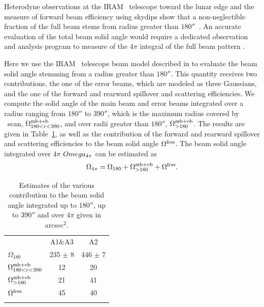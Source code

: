 Heterodyne observations at the IRAM \trentemetre\ telescope
toward the lunar edge and the measure of forward beam efficiency using
skydips show that a non-neglectible fraction of the full beam stems
from radius greater than $180''$~\citep{Greve2008, Kramer2013}.
An accurate evaluation of the total beam solid angle would require a
dedicated observation {\lp and analysis} program to measure of the $4\pi$ integral of the
full beam pattern \citep{Greve1998, Sugimoto2004, Gusten2006}.
{\lp Here we use the IRAM \trentemetre\ telescope beam model described
in \citet{Kramer2013} to evaluate the beam solid angle stemming from a
radius greater than $180''$.
This quantity receives two contributions, the one of the error beams,
which are modeled as three Gaussians, and the one of the forward and
rearward spillover and scattering efficiencies. We compute the solid
angle of the main beam and error beams integrated over a radius ranging
from $180''$ to $390''$, which is the maximum radius covered by \bm\ scan,
$\Omega_{180<r<390}^{\rm{mb+eb}}$, and over radii greater
than $180''$, $\Omega_{>180}^{\rm{mb+eb}}$. The results are given in
Table~\ref{tab:solid_corr}, as well as the contribution of the forward and
rearward spillover and scattering efficiencies to the beam solid angle
$\Omega^{\rm{frss}}$. The beam solid angle integrated over $4\pi$
$Omega_{\rm{4\pi}}$ can be estimated as
\begin{equation}
\Omega_{\rm{4\pi}} = \Omega_{180} + \Omega_{>180}^{\rm{mb+eb}}
+ \Omega^{\rm{frss}}.
\label{eq:omega_beam_4pi}
\end{equation}

\begin{table}[!h]
\caption{Estimates of the various contribution to the beam solid angle
integrated up to $180''$, up to $390''$ and over $4\pi$ given in
arcsec$^{2}$. }
\label{tab:solid_corr}
\centering
\begin{tabular}{lcc}
\hline\hline
\noalign{\smallskip}
&  A1\&A3 & A2 \\
\noalign{\smallskip}
\hline
\noalign{\smallskip}
$\Omega_{180}$                  &   235 $\pm$  8 & 446 $\pm$  7 \\
$\Omega_{180<r<390}^{\rm{mb+eb}}$  &   12          &   20       \\
$\Omega_{>180}^{\rm{mb+eb}}$      &   21          &   41      \\
$\Omega^{\rm{frss}}$             &   45          &   40      \\
\noalign{\smallskip}
\hline
\end{tabular}
\end{table}
}

